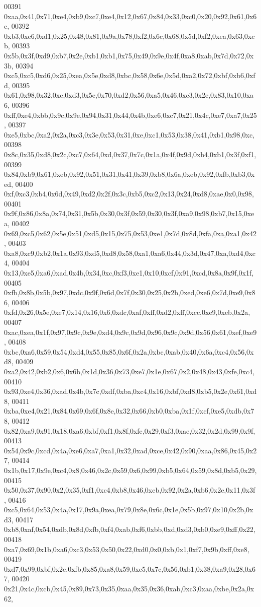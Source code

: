 \begin{DoxyCode}
00391   0xaa,0x41,0x71,0xe4,0xb9,0xc7,0xe4,0x12,0x67,0x84,0x33,0xc0,0x20,0x92,0x61,0x6c,
00392   0xb3,0xe6,0xd1,0x25,0x48,0x81,0x9a,0x78,0xf2,0x6c,0x68,0x5d,0xf2,0xea,0x63,0xcb,
00393   0x5b,0x3f,0xd9,0xb7,0x2e,0xb1,0xb1,0x75,0x49,0x9e,0x4f,0xa8,0xab,0x7d,0x72,0x3b,
00394   0xc5,0xc5,0xd6,0x25,0xea,0x5e,0xd8,0xbc,0x58,0x6e,0x5d,0xa2,0x72,0xbf,0xb6,0xfd,
00395   0x61,0x98,0x32,0xc,0xd3,0x5e,0x70,0xd2,0x56,0xa5,0x46,0xc3,0x2e,0x83,0x10,0xa6,
00396   0xff,0xe4,0xbb,0x9c,0x9e,0x94,0x31,0x44,0x4b,0xe6,0xc7,0x21,0x4c,0xe7,0xa7,0x25,
00397   0xe5,0xbc,0xa2,0x2a,0xc3,0x3e,0x53,0x31,0xe,0xc1,0x53,0x38,0x41,0xb1,0x98,0xc,
00398   0x8c,0x35,0xd8,0x2c,0xc7,0x64,0xd,0x37,0x7c,0x1a,0x4f,0x9d,0xb4,0xb1,0x3f,0xf1,
00399   0x84,0xb9,0x61,0xeb,0x92,0x51,0x31,0x41,0x39,0xb8,0x6a,0xeb,0x92,0xfb,0xb3,0xed,
00400   0xf,0xc3,0xb4,0x6d,0x49,0xd2,0x2f,0x3c,0xb5,0xc2,0x13,0x24,0xd8,0xae,0x0,0x98,
00401   0x9f,0x86,0x8a,0x74,0x31,0x5b,0x30,0x3f,0x59,0x30,0x3f,0xa9,0x98,0xb7,0x15,0xea,
00402   0x69,0xc5,0x62,0x5e,0x51,0xd5,0x15,0x75,0x53,0xe1,0x7d,0x8d,0xfa,0xa,0xa1,0x42,
00403   0xa8,0xc9,0xb2,0x1a,0x93,0xd5,0xd8,0x58,0xa1,0xa6,0x44,0x3d,0x47,0xa,0xd4,0xc4,
00404   0x13,0xe5,0xa6,0xad,0x4b,0x34,0xc,0xf3,0xe1,0x10,0xcf,0x91,0xcd,0x8a,0x9f,0x1f,
00405   0xfb,0x8b,0x5b,0x97,0xdc,0x9f,0x6d,0x7f,0x30,0x25,0x2b,0xed,0xe6,0x7d,0xe9,0x86,
00406   0xfd,0x26,0x5e,0xe7,0x14,0x16,0x6,0xdc,0xaf,0xff,0xd2,0xff,0xcc,0xe9,0xeb,0x2a,
00407   0xac,0xea,0x1f,0x97,0x9c,0x9e,0xd4,0x9c,0x9d,0x96,0x9c,0x9d,0x56,0x61,0xef,0xe9,
00408   0xbc,0xa6,0x59,0x54,0xd4,0x55,0x85,0x6f,0x2a,0xbc,0xab,0x40,0x6a,0xc4,0x56,0xd8,
00409   0xa2,0x42,0xb2,0x6,0x6b,0x1d,0x36,0x73,0xe7,0x1e,0x67,0x2,0x48,0x43,0xfe,0xc4,
00410   0x93,0xe4,0x36,0xad,0x4b,0x7c,0xdf,0xba,0xc4,0x16,0xbf,0xd8,0xb5,0x2e,0x61,0xd8,
00411   0xba,0xe4,0x21,0x84,0x69,0x6f,0x8e,0x32,0x66,0xb0,0xba,0x1f,0xcf,0xe5,0xdb,0x78,
00412   0x82,0xa9,0x91,0x18,0xa6,0xbf,0xf1,0x8f,0xfe,0x29,0xf3,0xae,0x32,0x2d,0x99,0x9f,
00413   0x54,0x9c,0xcd,0x4a,0xe6,0xa7,0xa1,0x32,0xad,0xce,0x42,0x90,0xaa,0x86,0x45,0x27,
00414   0x1b,0x17,0x9e,0xc4,0x8,0x46,0x2c,0x59,0x6,0x99,0xb5,0x64,0x59,0x8d,0xb5,0x29,
00415   0x50,0x37,0x90,0x2,0x35,0xf1,0xc4,0xb8,0x46,0xeb,0x92,0x2a,0xb6,0x2e,0x11,0x3f,
00416   0xc5,0x64,0x53,0x4a,0x17,0x9a,0xea,0x79,0x8e,0x6c,0x1e,0x5b,0x97,0x10,0x2b,0xd3,
00417   0xb8,0xaf,0x54,0xdb,0x8d,0xfb,0xf4,0xab,0xf6,0xbb,0xd,0xd3,0xb0,0xe9,0xff,0x22,
00418   0xa7,0x69,0x1b,0xa6,0xc3,0x53,0x50,0x22,0xd0,0x0,0xb,0x1,0xf7,0x9b,0xff,0xe8,
00419   0xd7,0x99,0xbf,0x2e,0xfb,0x85,0xa8,0x59,0xc5,0x7c,0x56,0xb1,0x38,0xa9,0x28,0x67,
00420   0x21,0x4c,0xcb,0x45,0x89,0x73,0x35,0xaa,0x35,0x36,0xab,0xc3,0xaa,0xbe,0x2a,0x62,

\end{DoxyCode}
